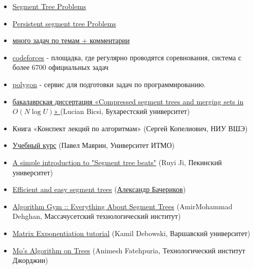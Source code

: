\begin{itemize}
	
	\item \href{https://codeforces.com/blog/entry/22616}{Segment Tree Problems}
	
	\item \href{https://codeforces.com/blog/entry/56880}{Persistent segment tree Problems}
	
	\item \href{https://codeforces.com/blog/entry/55274}{много задач по темам + комментарии}
	
	\item \href{https://codeforces.com}{codeforces} - площадка, где регулярно проводятся соревнования, система с более 6700 официальных задач
	
	\item \href{https://polygon.codeforces.com}{polygon} - сервис для подготовки задач по программированию.
	
	\item \href{https://codeforces.com/blog/entry/83170}{бакалаврская диссертация «Compressed segment trees and merging sets in $O(N \log U)$» } (Lucian Bicsi, Бухарестский университет)
	
	
	\item Книга «Конспект лекций по алгоритмам» (Сергей Копелиович, НИУ ВШЭ)
	
	\item \href{https://codeforces.com/edu/course/2}{Учебный курс} (Павел Маврин, Университет ИТМО)
	\item \href{https://codeforces.com/blog/entry/57319}{A simple introduction to "Segment tree beats"} (Ruyi Ji, Пекинский университет)
	
	\item \href{https://codeforces.com/blog/entry/18051}{Efficient and easy segment trees} (\href{http://finals.snarknews.info/index.cgi?data=2011/teams/knu&class=final2011&year=2011}{Александр Бачериков})
	
	\item \href{https://codeforces.com/blog/entry/15890}{Algorithm Gym :: Everything About Segment Trees} (AmirMohammad Dehghan, Массачусетский технологический институт)
	
	\item \href{https://codeforces.com/blog/entry/80195}{Matrix Exponentiation tutorial} (Kamil Debowski, Варшавский университет)
	
	\item \href{https://codeforces.com/blog/entry/43230}{Mo's Algorithm on Trees} (Animesh Fatehpuria, Технологический институт Джорджии)
	

\end{itemize}
